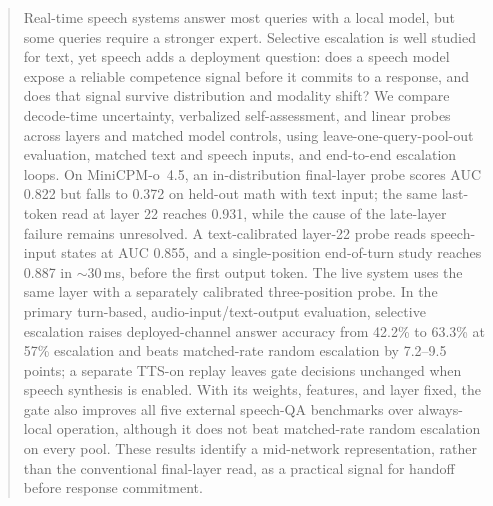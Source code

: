 \begin{abstract}
Real-time speech systems answer most queries with a local model, but
some queries require a stronger expert. Selective escalation is well studied
for text, yet speech adds a deployment question: does a speech model
expose a reliable competence signal before it commits to a
response, and does that signal survive distribution and modality shift?
We compare decode-time uncertainty, verbalized self-assessment, and
linear probes across layers and matched model controls, using
leave-one-query-pool-out evaluation, matched text and speech inputs,
and end-to-end escalation loops. On MiniCPM-o~4.5, an in-distribution
final-layer probe scores AUC 0.822 but falls to 0.372 on held-out math
with text input; the same last-token read at layer 22 reaches 0.931,
while the cause of the late-layer failure remains unresolved. A
text-calibrated layer-22 probe reads speech-input states at AUC 0.855,
and a single-position end-of-turn study reaches 0.887 in
$\sim$30\,ms, before the first output token. The live system uses the
same layer with a separately calibrated three-position probe. In the
primary turn-based, audio-input/text-output evaluation, selective
escalation raises deployed-channel answer accuracy from 42.2\% to
63.3\% at 57\% escalation and beats matched-rate random escalation by
7.2--9.5 points; a separate TTS-on replay leaves gate decisions
unchanged when speech synthesis is enabled. With its weights, features,
and layer fixed, the gate also
improves all five external speech-QA benchmarks over always-local
operation, although it does not beat matched-rate random escalation on
every pool. These results identify a mid-network representation, rather
than the conventional final-layer read, as a practical signal for
handoff before response commitment.
\end{abstract}

